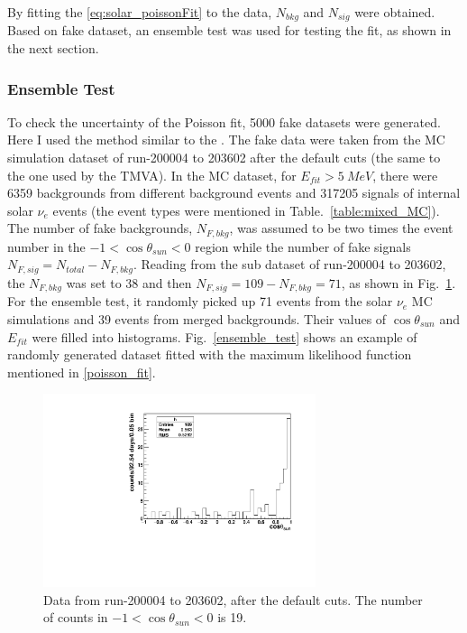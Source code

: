 By fitting the \ref{eq:solar_poissonFit} to the data, $N_{bkg}$ and $N_{sig}$ were obtained. Based on fake dataset, an ensemble test was used for testing the fit, as shown in the next section.
%
%
\subsubsection{Ensemble Test}
To check the uncertainty of the Poisson fit, 5000 fake datasets were generated. Here I used the method similar to the \cite{leta}.
The fake data were taken from the MC simulation dataset of run-200004 to 203602 after the default cuts (the same to the one used by the TMVA). In the MC dataset, for $E_{fit}>5~MeV$, there were 6359 backgrounds from different background events and 317205 signals of internal solar $\nu_e$ events (the event types were mentioned in Table.~\ref{table:mixed_MC}).
The number of fake backgrounds, $N_{F,bkg}$, was assumed to be two times the event number in the $-1<\cos\theta_{sun}<0$ region while the number of fake signals $N_{F,sig}=N_{total}-N_{F,bkg}$. Reading from the sub dataset of run-200004 to 203602, the $N_{F,bkg}$ was set to 38 and then $N_{F,sig}=109-N_{F,bkg}=71$, as shown in Fig.~\ref{half_data}. For the ensemble test, it randomly picked up 71 events from the solar $\nu_e$ MC simulations and 39 events from merged backgrounds. Their values of $\cos\theta_{sun}$ and $E_{fit}$ were filled into histograms. Fig.~\ref{ensemble_test} shows an example of randomly generated dataset fitted with the maximum likelihood function mentioned in \ref{poisson_fit}.
\begin{figure}[!htb]
	\centering
	\includegraphics[width=8cm]{cosThetaToSun_halfData_5to15.pdf}
	\caption{Data from run-200004 to 203602, after the default cuts. The number of counts in $-1<\cos\theta_{sun}<0$ is 19.}
	\label{half_data}
\end{figure}

